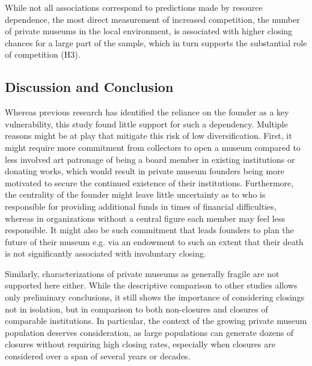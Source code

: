 \documentclass[12pt]{article}
\begin{document}
While not all associations correspond to predictions made by resource dependence, the most direct measurement of increased competition, the number of private museums in the local environment, is associated with higher closing chances for a large part of the sample, which in turn supports the substantial role of competition (H3).
\subsection*{Discussion and Conclusion}





Whereas previous research has identified the reliance on the founder as a key vulnerability, this study found little support for such a dependency.
Multiple reasons might be at play that mitigate this risk of low diversification.
First, it might require more commitment from collectors to open a museum compared to less involved art patronage of being a board member in existing institutions or donating works, which would result in private museum founders being more motivated to secure the continued existence of their institutions.
Furthermore, the centrality of the founder might leave little uncertainty as to who is responsible for providing additional funds in times of financial difficulties, whereas in organizations without a central figure each member may feel less responsible.
It might also be such commitment that leads founders to plan the future of their museum e.g. via an endowment to such an extent that their death is not significantly associated with involuntary closing.



Similarly, characterizations of private museums as generally fragile \parencite{Adam_2020_close,Bechtler_Imhof_2018_future} are not supported here either.
While the descriptive comparison to other studies allows only preliminary conclusions, it still shows the importance of considering closings not in isolation, but in comparison to both non-closures and closures of comparable institutions.
In particular, the context of the growing private museum population deserves consideration, as large populations can generate dozens of closures without requiring high closing rates, especially when closures are considered over a span of several years or decades.
\end{document}
